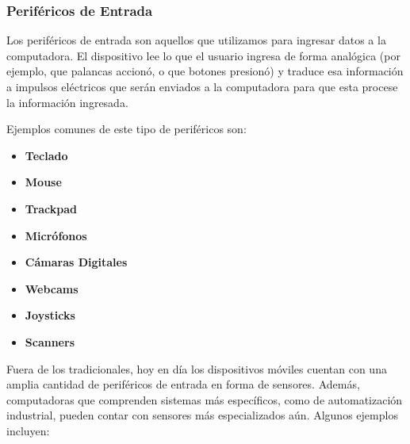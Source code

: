 \subsubsection*{Periféricos de Entrada}
\label{chap:computadoras:subsubsec:perifericos_entrada}

Los periféricos de entrada son aquellos que utilizamos para ingresar datos a la
computadora. El dispositivo lee lo que el usuario ingresa de forma analógica
(por ejemplo, que palancas accionó, o que botones presionó) y traduce esa
información a impulsos eléctricos que serán enviados a la computadora para que
esta procese la información ingresada.\autocite[p. 246]{laplante_2000}

Ejemplos comunes de este tipo de periféricos son:

\begin{minipage}{0.45\textwidth}
    \begin{itemize}
        \item \textbf{Teclado}
        \item \textbf{Mouse}
        \item \textbf{Trackpad}
        \item \textbf{Micrófonos}
    \end{itemize}
\end{minipage}
\begin{minipage}{0.45\textwidth}
    \begin{itemize}
        \item \textbf{Cámaras Digitales}
        \item \textbf{Webcams}
        \item \textbf{Joysticks}
        \item \textbf{Scanners}
    \end{itemize}
\end{minipage}

Fuera de los tradicionales, hoy en día los dispositivos móviles cuentan con una
amplia cantidad de periféricos de entrada en forma de sensores. Además,
computadoras que comprenden sistemas más específicos, como de automatización
industrial, pueden contar con sensores más especializados aún. Algunos ejemplos
incluyen:

